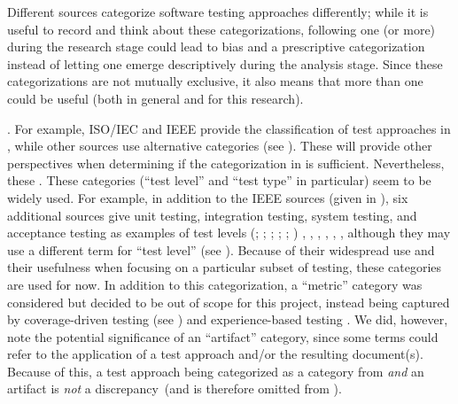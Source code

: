 Different sources categorize software testing approaches differently\ifnotpaper;
while it is useful to record and think about these categorizations, following
one (or more) during the research
stage could lead to bias and a prescriptive categorization instead of letting
one emerge descriptively during the analysis stage. Since these categorizations
are not mutually exclusive, it also means that more than one could be useful
(both in general and for this research).\par \citet{IEEE2022} \else. For
example, ISO/IEC and IEEE \cite{IEEE2022} \fi provide the classification of test
approaches in \ifnotpaper, while other sources
\citep{BarbosaEtAl2006, SouzaEtAl2017} use alternative categories (see
). These will provide other perspectives when
determining if the categorization in  is sufficient.
Nevertheless, these \else. These \fi categories (``test level'' and ``test
type'' in particular) seem to be widely used. For example, in addition to the
IEEE sources (given in ), six additional sources give
unit testing, integration testing, system testing, and acceptance testing as
examples of test levels \ifnotpaper
    (\citealp[pp.~5-6 to 5-7]{SWEBOK2024}; \citealpISTQB{};
    \citealp[p.~218]{KuļešovsEtAl2013};
    \citealp[p.~807-808]{Perry2006}; \citealp[pp.~443-445]{PetersAndPedrycz2000};
    \citealp[pp.~9,~13]{Gerrard2000a})\else
    \cite{ISTQB}, \cite[pp.~5-6 to 5-7]{SWEBOK2024},
    \cite[pp.~9,~13]{Gerrard2000a}, \cite[p.~807-808]{Perry2006},
    \cite[pp.~443-445]{PetersAndPedrycz2000}, \citealp[p.~218]{KuļešovsEtAl2013}%
    \fi, although they may use a different term for ``test
level'' (see ). Because of their widespread use and
their usefulness when focusing on a particular subset of testing, these
categories are used for now. \ifnotpaper In addition to this categorization, a
    ``metric'' category was considered but decided to be
    out of scope for this project, instead being captured by coverage-driven
    testing (see ) and experience-based testing
    \citep[p.~34]{IEEE2022}. \fi We did, however, note the potential
significance of an ``artifact'' category, since some
terms could refer to the application of a test approach and/or the resulting
document(s). Because of this, a test approach being categorized as a category
from  \emph{and} an artifact is \emph{not} a
discrepancy\ifnotpaper\ (and is therefore omitted from
    )\fi.

